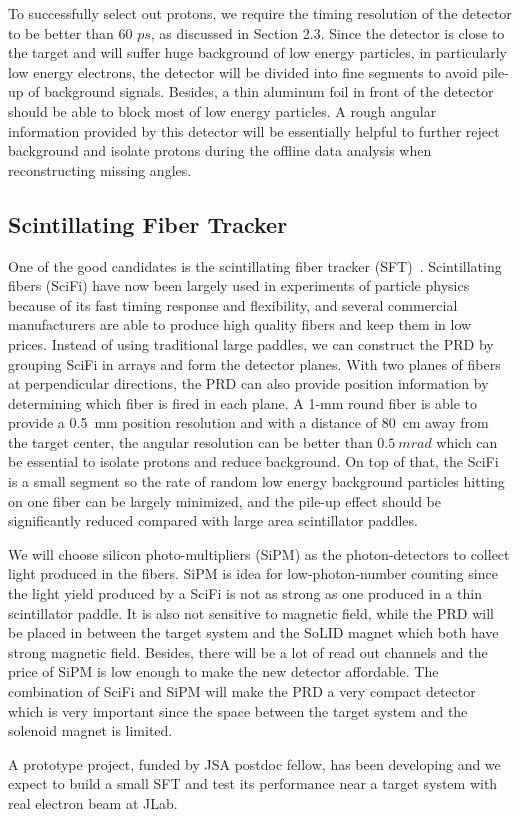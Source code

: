 To successfully select out protons, we require the timing resolution of the detector to be better than 60 $ps$, as discussed in Section 2.3. Since the detector is close to the target and will suffer huge background of low energy particles, in particularly low energy electrons, the detector will be divided into fine segments to avoid pile-up of background signals. Besides, a thin aluminum foil in front of the detector should be able to block most of low energy particles. A rough angular information provided by this detector will be essentially helpful to further reject background and isolate protons during the offline data analysis when reconstructing missing angles.

\subsection{Scintillating Fiber Tracker}
One of the good candidates is the scintillating fiber tracker (SFT)~\cite{sft_zye}. Scintillating fibers (SciFi) have now been largely used in experiments of particle physics because of its fast timing response and flexibility, and several commercial manufacturers are able to produce high quality fibers and keep them in low prices. Instead of using traditional large paddles, we can construct the PRD by grouping SciFi in arrays and form the detector planes.  With two planes of fibers at perpendicular directions, the PRD can also provide position information by determining which fiber is fired in each plane. A 1-mm round fiber is able to provide a 0.5~mm position resolution and with a distance of 80~cm away from the target center, the angular resolution can be better than $0.5~mrad$ which can be essential to isolate protons and reduce background. On top of that, the SciFi is a small segment so the rate of random low energy background particles hitting on one fiber can be largely minimized, and the pile-up effect should be significantly reduced compared with large area scintillator paddles.

We will choose silicon photo-multipliers (SiPM) as the photon-detectors to collect light produced in the fibers. SiPM is idea for low-photon-number counting since the light yield produced by a SciFi is not as strong as one produced in a thin scintillator paddle. It is also not sensitive to magnetic field, while the PRD will be placed in between the target system and the SoLID magnet which both have strong magnetic field. Besides, there will be a lot of read out channels and the price of SiPM is low enough to make the new detector affordable.  The combination of SciFi and SiPM will make the PRD a very compact detector which is very important since the space between the target system and the solenoid magnet is limited. 

A prototype project, funded by JSA postdoc fellow, has been developing and we expect to build a small SFT and test its performance near a target system with real electron beam at JLab. 

